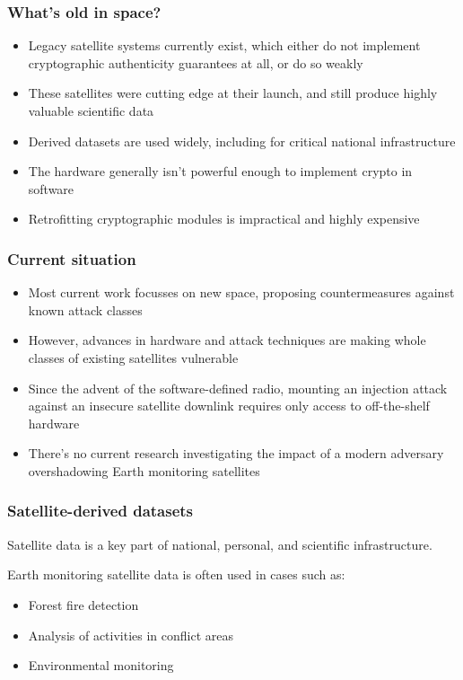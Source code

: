 \documentclass{beamer}
\begin{document}
\begin{frame}
  \frametitle{What's old in space?}
  \begin{itemize}
    \item Legacy satellite systems currently exist, which either do not implement cryptographic authenticity guarantees at all, or do so weakly
    \item These satellites were cutting edge at their launch, and still produce highly valuable scientific data
    \item Derived datasets are used widely, including for critical national infrastructure
    \item The hardware generally isn't powerful enough to implement crypto in software
    \item Retrofitting cryptographic modules is impractical and highly expensive
  \end{itemize}
\end{frame}

\begin{frame}
  \frametitle{Current situation}
  \begin{itemize}[<+->]
    \item Most current work focusses on new space, proposing countermeasures against known attack classes
    \item However, advances in hardware and attack techniques are making whole classes of existing satellites vulnerable
    \item Since the advent of the software-defined radio, mounting an injection attack against an insecure satellite downlink requires only access to off-the-shelf hardware
    \item There's no current research investigating the impact of a modern adversary overshadowing Earth monitoring satellites
  \end{itemize}
\end{frame}

\begin{frame}
  \frametitle{Satellite-derived datasets}
  Satellite data is a key part of national, personal, and scientific infrastructure.
  \newline

  Earth monitoring satellite data is often used in cases such as:

  \begin{itemize}
    \item Forest fire detection
    \item Analysis of activities in conflict areas
    \item Environmental monitoring
  \end{itemize}
\end{frame}
\end{document}
